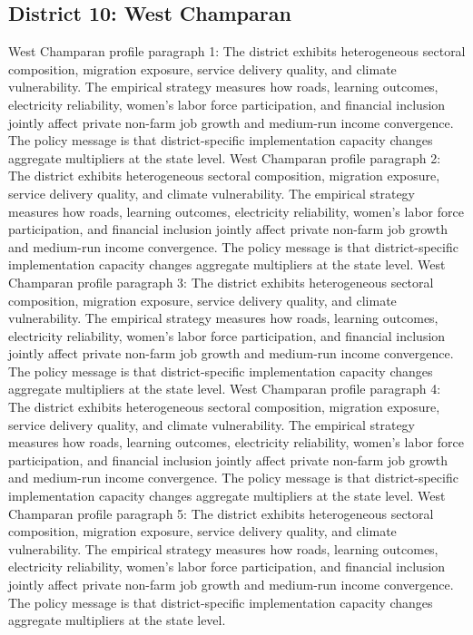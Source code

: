 \documentclass[preprint,12pt]{elsarticle}
\begin{document}
\subsection{District 10: West Champaran}
West Champaran profile paragraph 1: The district exhibits heterogeneous sectoral composition, migration exposure, service delivery quality, and climate vulnerability. The empirical strategy measures how roads, learning outcomes, electricity reliability, women's labor force participation, and financial inclusion jointly affect private non-farm job growth and medium-run income convergence. The policy message is that district-specific implementation capacity changes aggregate multipliers at the state level.
West Champaran profile paragraph 2: The district exhibits heterogeneous sectoral composition, migration exposure, service delivery quality, and climate vulnerability. The empirical strategy measures how roads, learning outcomes, electricity reliability, women's labor force participation, and financial inclusion jointly affect private non-farm job growth and medium-run income convergence. The policy message is that district-specific implementation capacity changes aggregate multipliers at the state level.
West Champaran profile paragraph 3: The district exhibits heterogeneous sectoral composition, migration exposure, service delivery quality, and climate vulnerability. The empirical strategy measures how roads, learning outcomes, electricity reliability, women's labor force participation, and financial inclusion jointly affect private non-farm job growth and medium-run income convergence. The policy message is that district-specific implementation capacity changes aggregate multipliers at the state level.
West Champaran profile paragraph 4: The district exhibits heterogeneous sectoral composition, migration exposure, service delivery quality, and climate vulnerability. The empirical strategy measures how roads, learning outcomes, electricity reliability, women's labor force participation, and financial inclusion jointly affect private non-farm job growth and medium-run income convergence. The policy message is that district-specific implementation capacity changes aggregate multipliers at the state level.
West Champaran profile paragraph 5: The district exhibits heterogeneous sectoral composition, migration exposure, service delivery quality, and climate vulnerability. The empirical strategy measures how roads, learning outcomes, electricity reliability, women's labor force participation, and financial inclusion jointly affect private non-farm job growth and medium-run income convergence. The policy message is that district-specific implementation capacity changes aggregate multipliers at the state level.
\end{document}
